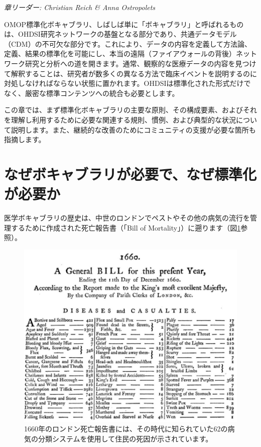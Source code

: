 \documentclass[
  11pt]{book}
\theoremstyle{definition}
\theoremstyle{definition}
\theoremstyle{definition}
\theoremstyle{definition}
\theoremstyle{remark}
\begin{document}

\emph{章リーダー: Christian Reich \& Anna Ostropolets}

OMOP標準化ボキャブラリ、しばしば単に「ボキャブラリ」と呼ばれるものは、OHDSI研究ネットワークの基盤となる部分であり、共通データモデル（CDM）の不可欠な部分です。これにより、データの内容を定義して方法論、定義、結果の標準化を可能にし、本当の遠隔（ファイアウォールの背後）ネットワーク研究と分析への道を開きます。通常、観察的な医療データの内容を見つけて解釈することは、研究者が数多くの異なる方法で臨床イベントを説明するのに対処しなければならない状態に置かれます。OHDSIは標準化された形式だけでなく、厳密な標準コンテンツへの統合も必要とします。

この章では、まず標準化ボキャブラリの主要な原則、その構成要素、およびそれを理解し利用するために必要な関連する規則、慣例、および典型的な状況について説明します。また、継続的な改善のためにコミュニティの支援が必要な箇所も指摘します。

\section{なぜボキャブラリが必要で、なぜ標準化が必要か}\label{ux306aux305cux30dcux30adux30e3ux30d6ux30e9ux30eaux304cux5fc5ux8981ux3067ux306aux305cux6a19ux6e96ux5316ux304cux5fc5ux8981ux304b}

医学ボキャブラリの歴史は、中世のロンドンでペストやその他の病気の流行を管理するために作成された死亡報告書（「Bill of Mortality」）に遡ります（図\ref{fig:bill}参照）。

\begin{figure}

{\centering \includegraphics[width=1\linewidth]{images/StandardizedVocabularies/bill} 

}

\caption{1660年のロンドン死亡報告書には、その時代に知られていた62の病気の分類システムを使用して住民の死因が示されています。}\label{fig:bill}
\end{figure}
\end{document}
